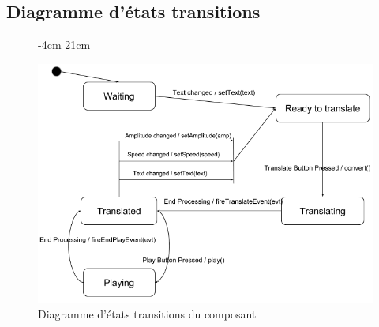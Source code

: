 \documentclass[a4paper,11pt]{article}
\begin{document}
    \subsection{Diagramme d'états transitions}
    \begin{figure}[H]
         -4cm 21cm
        \begin{center}
            \includegraphics[scale=0.8]{etatsdiag.png}
            \caption{Diagramme d'états transitions du composant}
            \label{Diagramme d'états transitions du composant}
        \end{center}
    \end{figure}
\end{document}
